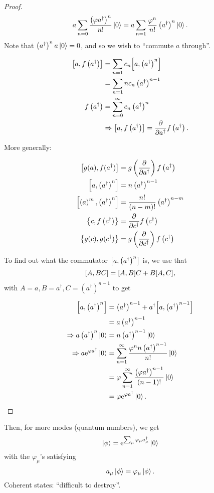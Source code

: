 \begin{proof}
\label{unc:proof}
\begin{equation*}
a\sum_{n=0}\frac{\left(\varphi a^\dagger\right)^n}{n!}\ket{0} = a\sum_{n=1} \frac{\varphi^n}{n!}\left(a^\dagger\right)^n\ket{0}.
\end{equation*}
Note that $\left(a^\dagger\right)^na\ket{0} = 0$, and so we wish to ``commute $a$ through''.

\begin{align*}
\comm{a}{f\left(a^\dagger\right)} &= \sum_{n=1}c_n\comm{a}{\left(a^\dagger\right)^n} \\
&= \sum_{n=1}nc_n\left(a^\dagger\right)^{n-1}\\
f\left(a^\dagger\right) &= \sum_{n=0}^\infty c_n\left(a^\dagger\right)^n \\
&\Rightarrow \comm{a}{f\left(a^\dagger\right)} = \pdv{a^\dagger}f\left(a^\dagger\right).
\end{align*}

More generally:

\begin{align*}
\comm{g(a)}{f(a^\dagger)} &= g\left(\pdv{a^\dagger}\right)f\left(a^\dagger\right)\\
\comm{a}{\left(a^\dagger\right)^n} &= n\left(a^\dagger\right)^{n-1} \\
\comm{\left(a\right)^m}{\left(a^\dagger\right)^n} &= \frac{n!}{(n-m)!}\left(a^\dagger\right)^{n-m} \\
\acomm{c}{f\left(c^\dagger\right)} &= \pdv{c^\dagger}f\left(c^\dagger\right) \\
\acomm{g(c)}{g(c^\dagger)} &= g\left(\pdv{c^\dagger}\right)f\left(c^\dagger\right)
\end{align*}

To find out what the commutator $\comm{a}{\left(a^\dagger\right)^n}$ is, we use that 
\begin{equation}
\comm{A}{BC} = \comm{A}{B}C + B\comm{A}{C}, 
\end{equation}
with $A =a, B = a^\dagger, C = \left(a^\dagger\right)^{n-1}$ to get

\begin{align*}
\comm{a}{\left(a^\dagger\right)^n} &= \left(a^\dagger\right)^{n-1} + a^\dagger\comm{a}{\left(a^\dagger\right)^{n-1}} \\
&= a\left(a^\dagger\right)^{n-1} \\
\Rightarrow a\left(a^\dagger\right)^{n}\ket{0} &= n\left(a^\dagger\right)^{n-1}\ket{0}\\
\Rightarrow a\e^{\varphi a^\dagger}\ket{0} &= \sum_{n=1}^\infty\frac{\varphi^nn\left(a^\dagger\right)^{n-1}}{n!}\ket{0} \\
&= \varphi\sum_{n=1}^\infty\frac{\left(\varphi a^\dagger\right)^{n-1}}{(n-1)!}\ket{0}\\ &= \varphi\e^{\varphi a^\dagger}\ket{0}.
\end{align*}
\end{proof}

Then, for more modes (quantum numbers), we get
\begin{equation}
\ket{\phi} = \mathrm{e}^{\sum_\mu\varphi_\mu a_\mu^\dagger}\ket{0}
\end{equation}
with the $\varphi_\mu$'s satisfying
\begin{equation}
a_\mu\ket{\phi} = \varphi_\mu\ket{\phi}.
\end{equation}
Coherent states: ``difficult to destroy''.